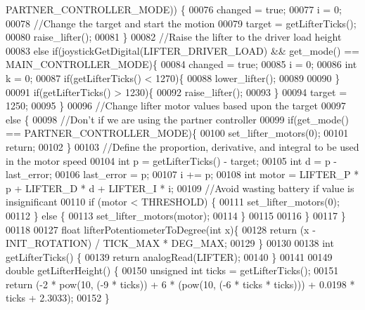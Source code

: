 \begin{DoxyCode}
      PARTNER_CONTROLLER_MODE)) \{
00076     changed = \textcolor{keyword}{true};
00077     i = 0;
00078     \textcolor{comment}{//Change the target and start the motion}
00079     target = getLifterTicks();
00080     raise_lifter();
00081   \}
00082   \textcolor{comment}{//Raise the lifter to the driver load height}
00083   \textcolor{keywordflow}{else} \textcolor{keywordflow}{if}(joystickGetDigital(LIFTER_DRIVER_LOAD) && get_mode() == 
      MAIN_CONTROLLER_MODE)\{
00084     changed = \textcolor{keyword}{true};
00085     i = 0;
00086     \textcolor{keywordtype}{int} k = 0;
00087     \textcolor{keywordflow}{if}(getLifterTicks() < 1270)\{
00088       lower_lifter();
00089 
00090     \}
00091     \textcolor{keywordflow}{if}(getLifterTicks() > 1230)\{
00092       raise_lifter();
00093     \}
00094     target = 1250;
00095   \}
00096   \textcolor{comment}{//Change lifter motor values based upon the target}
00097   \textcolor{keywordflow}{else} \{
00098     \textcolor{comment}{//Don't if we are using the partner controller}
00099     \textcolor{keywordflow}{if}(get_mode() == PARTNER_CONTROLLER_MODE)\{
00100       set_lifter_motors(0);
00101       \textcolor{keywordflow}{return};
00102     \}
00103     \textcolor{comment}{//Define the proportion, derivative, and integral to be used in the motor speed}
00104     \textcolor{keywordtype}{int} p = getLifterTicks() - target;
00105     \textcolor{keywordtype}{int} d = p - last\_error;
00106     last\_error = p;
00107     i += p;
00108     \textcolor{keywordtype}{int} motor = LIFTER_P * p + LIFTER_D * d + LIFTER_I * i;
00109     \textcolor{comment}{//Avoid wasting battery if value is insignificant}
00110     \textcolor{keywordflow}{if} (motor < THRESHOLD) \{
00111         set_lifter_motors(0);
00112     \} \textcolor{keywordflow}{else} \{
00113         set_lifter_motors(motor);
00114     \}
00115 
00116   \}
00117 \}
00118 
00127 \textcolor{keywordtype}{float} lifterPotentiometerToDegree(\textcolor{keywordtype}{int} x)\{
00128   \textcolor{keywordflow}{return} (x - INIT_ROTATION) / TICK_MAX * DEG_MAX;
00129 \}
00130 
00138 \textcolor{keywordtype}{int} getLifterTicks() \{
00139   \textcolor{keywordflow}{return} analogRead(LIFTER);
00140 \}
00141 
00149 \textcolor{keywordtype}{double} getLifterHeight() \{
00150   \textcolor{keywordtype}{unsigned} \textcolor{keywordtype}{int} ticks = getLifterTicks();
00151   \textcolor{keywordflow}{return} (-2 * pow(10, (-9 * ticks)) + 6 * (pow(10, (-6 * ticks * ticks))) + 0.0198 * ticks + 2.3033);
00152 \}
\end{DoxyCode}
